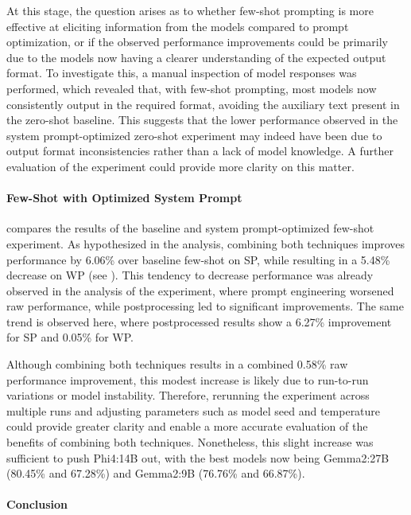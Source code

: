 At this stage, the question arises as to whether few-shot prompting is more effective at eliciting information from the models compared to prompt optimization, or if the observed performance improvements could be primarily due to the models now having a clearer understanding of the expected output format. To investigate this, a manual inspection of model responses was performed, which revealed that, with few-shot prompting, most models now consistently output in the required format, avoiding the auxiliary text present in the zero-shot baseline. This suggests that the lower performance observed in the system prompt-optimized zero-shot experiment may indeed have been due to output format inconsistencies rather than a lack of model knowledge. A further evaluation of the  experiment could provide more clarity on this matter.

\paragraph{Few-Shot with Optimized System Prompt}

 compares the results of the baseline and system prompt-optimized few-shot experiment. As hypothesized in the  analysis, combining both techniques improves performance by 6.06\% over baseline few-shot on \ac{SP}, while resulting in a 5.48\% decrease on \ac{WP} (see ). This tendency to decrease performance was already observed in the analysis of the  experiment, where prompt engineering worsened raw performance, while postprocessing led to significant improvements. The same trend is observed here, where postprocessed results show a 6.27\% improvement for \ac{SP} and 0.05\% for \ac{WP}.

Although combining both techniques results in a combined 0.58\% raw performance improvement, this modest increase is likely due to run-to-run variations or model instability. Therefore, rerunning the experiment across multiple runs and adjusting parameters such as model seed and temperature could provide greater clarity and enable a more accurate evaluation of the benefits of combining both techniques. Nonetheless, this slight increase was sufficient to push Phi4:14B out, with the best models now being Gemma2:27B (80.45\% and 67.28\%) and Gemma2:9B (76.76\% and 66.87\%).

\paragraph{Conclusion}

